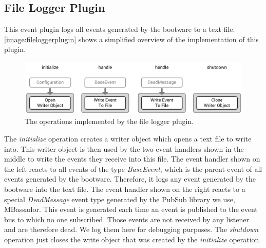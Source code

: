 \subsection{File Logger Plugin}

This event plugin logs all events generated by the bootware to a text file.
\autoref{image:fileloggerplugin} shows a simplified overview of the implementation of this plugin.

\begin{figure}[!htbp]
	\centering
	\includegraphics[resolution=600]{implementation/assets/filelogger_plugin}
	\caption{The operations implemented by the file logger plugin.}
	\label{image:fileloggerplugin}
\end{figure}

The \textit{initialize} operation creates a writer object which opens a text file to write into.
This writer object is then used by the two event handlers shown in the middle to write the events they receive into this file.
The event handler shown on the left reacts to all events of the type \textit{BaseEvent}, which is the parent event of all events generated by the bootware.
Therefore, it logs any event generated by the bootware into the text file.
The event handler shown on the right reacts to a special \textit{DeadMessage} event type generated by the PubSub library we use, MBassador.
This event is generated each time an event is published to the event bus to which no one subscribed.
Those events are not received by any listener and are therefore dead.
We log them here for debugging purposes.
The \textit{shutdown} operation just closes the write object that was created by the \textit{initialize} operation.
